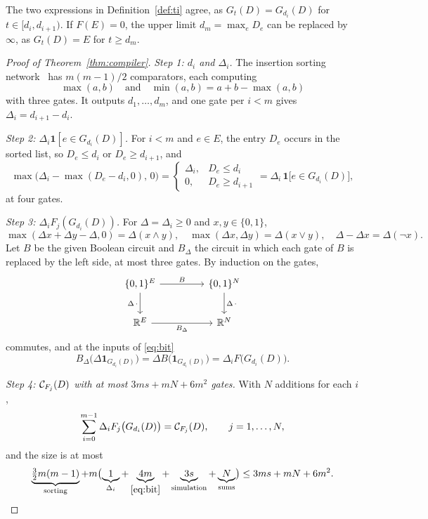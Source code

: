 The two expressions in Definition~\ref{def:ti} agree, as $G_t(D)=G_{d_i}(D)$ for
$t\in[d_i,d_{i+1})$.  If $F(E)=0$, the upper limit $d_m=\max_eD_e$ can be replaced
by $\infty$, as $G_t(D)=E$ for $t\ge d_m$.

\begin{proof}[Proof of Theorem~\ref{thm:compiler}]
\emph{Step 1: $d_i$ and $\Delta_i$.}  The insertion sorting network~\cite{knuth98-taocp3} has
$m(m-1)/2$ comparators, each computing
\[
  \max(a,b)\quad\text{and}\quad\min(a,b)=a+b-\max(a,b)
\]
with three gates.  It outputs $d_1,\ldots,d_m$, and one gate per $i<m$ gives
$\Delta_i=d_{i+1}-d_i$.

\emph{Step 2: $\Delta_i\mathbf 1[e\in G_{d_i}(D)]$.}  For $i<m$ and $e\in E$, the entry $D_e$
occurs in the sorted list, so $D_e\le d_i$ or $D_e\ge d_{i+1}$, and
\begin{equation}
  \max\bigl(\Delta_i-\max(D_e-d_i,0),\,0\bigr)
  =\begin{cases}\Delta_i,&D_e\le d_i\\0,&D_e\ge d_{i+1}\end{cases}
  =\Delta_i\,\mathbf 1\bigl[e\in G_{d_i}(D)\bigr],
  \label{eq:bit}
\end{equation}
at four gates.

\emph{Step 3: $\Delta_iF_j(G_{d_i}(D))$.}  For $\Delta=\Delta_i\ge0$ and $x,y\in\{0,1\}$,
\[
  \max(\Delta x+\Delta y-\Delta,0)=\Delta(x\wedge y),\quad
  \max(\Delta x,\Delta y)=\Delta(x\vee y),\quad
  \Delta-\Delta x=\Delta(\neg x).
\]
Let $B$ be the given Boolean circuit and $B_\Delta$ the circuit in which each gate of
$B$ is replaced by the left side, at most three gates.  By induction on the gates,
\[
  \begin{tikzcd}[column sep=4.5em,row sep=2.2em]
    \{0,1\}^{E}\arrow[r,"B"]\arrow[d,"\Delta\,\cdot"'] & \{0,1\}^{N}\arrow[d,"\Delta\,\cdot"]\\
    \R^{E}\arrow[r,"B_\Delta"'] & \R^{N}
  \end{tikzcd}
\]
commutes, and at the inputs of \eqref{eq:bit}
\[
  B_\Delta\bigl(\Delta\mathbf 1_{G_{d_i}(D)}\bigr)=\Delta B\bigl(\mathbf 1_{G_{d_i}(D)}\bigr)
  =\Delta_iF\bigl(G_{d_i}(D)\bigr).
\]

\emph{Step 4: $\mathcal C_{F_j}(D)$ with at most $3ms+mN+6m^{2}$ gates.}  With $N$ additions for each $i$,
\[
  \sum_{i=0}^{m-1}\Delta_iF_j\bigl(G_{d_i}(D)\bigr)=\mathcal C_{F_j}(D),\qquad j=1,\ldots,N,
\]
and the size is at most
\[
  \underbrace{\tfrac32m(m-1)}_{\text{sorting}}
  +m\bigl(\underbrace{1}_{\Delta_i}+\underbrace{4m}_{\eqref{eq:bit}}
  +\underbrace{3s}_{\text{simulation}}+\underbrace{N}_{\text{sums}}\bigr)
  \le3ms+mN+6m^{2}.\qedhere
\]
\end{proof}

